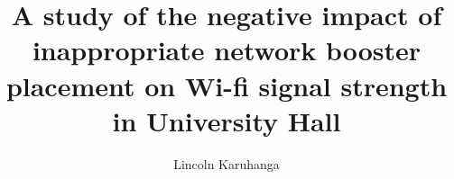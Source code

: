 \documentclass[a4paper,12pt,openany]{report}
\begin{document}
\title{\LARGE {\bf A study of the negative impact of inappropriate network booster placement on Wi-fi signal strength in University Hall}\\
 \vspace*{6mm}
}

\author{Lincoln Karuhanga}

\normallinespacing
\maketitle

\preface


\body





\end{document}
